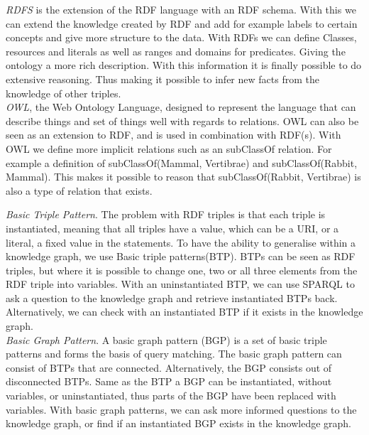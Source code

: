 \documentclass[11pt,letterpaper ,oneside ]{book}
\begin{document}
\textit{RDFS} \cite{RDFSchema:2014} is the extension of the RDF language with an RDF schema. With this we can extend the knowledge created by RDF and add for example labels to certain concepts and give more structure to the data. With RDFs we can define Classes, resources and literals as well as ranges and domains for predicates. Giving the ontology a more rich description. With this information it is finally possible to do extensive reasoning. Thus making it possible to infer new facts from the knowledge of other triples.\\

\textit{OWL}\cite{OWLPrimer:2012}, the Web Ontology Language, designed to represent the language that can describe things and set of things well with regards to relations. OWL can also be seen as an extension to RDF, and is used in combination with RDF(s). With OWL we define more implicit relations such as an subClassOf relation. For example a definition of subClassOf(Mammal, Vertibrae) and subClassOf(Rabbit, Mammal). This makes it possible to reason that subClassOf(Rabbit, Vertibrae) is also a type of relation that exists. 

	\textit{Basic Triple Pattern}. The problem with RDF triples is that each triple is instantiated, meaning that all triples have a value, which can be a URI, or a literal,  a fixed value in the statements. 
	To have the ability to generalise within a knowledge graph, we use Basic triple patterns(BTP). BTPs can be seen as RDF triples, but where it is possible to change one, two or all three elements from the RDF triple into variables. With an uninstantiated BTP, we can use SPARQL to ask a question to the knowledge graph and retrieve instantiated BTPs back. Alternatively, we can check with an instantiated BTP if it exists in the knowledge graph.\\
	
	\textit{Basic Graph Pattern}. A basic graph pattern (BGP) is a set of basic triple patterns and forms the basis of query matching. The basic graph pattern
	can consist of BTPs that are connected.
	Alternatively, the BGP consists out of disconnected BTPs. Same as the BTP a BGP can be instantiated, without variables, or uninstantiated, thus parts of the BGP have been replaced with variables. With basic graph patterns, we can ask more informed questions to the knowledge graph, or find if an instantiated BGP exists in the knowledge graph.\\
	
\end{document}
